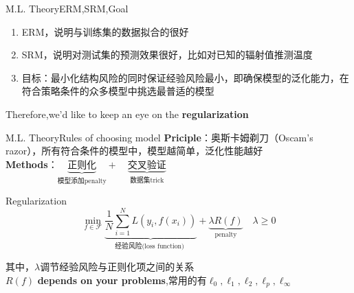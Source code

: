 \documentclass{beamer}
\begin{document}

\begin{frame}{M.L. Theory}{\quad \quad\quad ERM,SRM,Goal}
\begin{enumerate}
  \item ERM，说明与训练集的数据拟合的很好
  \item SRM，说明对测试集的预测效果很好，比如对已知的辐射值推测温度
  \item 目标：最小化结构风险的同时保证经验风险最小，即确保模型的泛化能力，在符合策略条件的众多模型中挑选最普适的模型
  \end{enumerate}  
  \quad \quad Therefore,we\rq{}d like to keep an eye on the \textbf{regularization}


\end{frame}
\begin{frame}[t]{M.L. Theory}{\quad \quad\quad Rules of choosing model}
\textbf{Priciple}：奥斯卡姆剃刀（Oscam's razor），所有符合条件的模型中，模型越简单，泛化性能越好\\
\textbf{Methods}：$
 \underbrace{\textbf{正则化}}_{\text{模型添加penalty}} +\quad  \underbrace{\textbf{交叉验证}}_{\text{数据集trick}}$


\begin{block}{Regularization}
\begin{equation}
\min\limits_{f \in \mathcal{F}}\underbrace{\frac{1}{N}\sum_{i=1}^N L(y_i,f(x_i))}_{\text{经验风险(loss function) }}+ \underbrace{ \lambda R(f)}_{\text{penalty}}\quad \lambda \geq 0
\end{equation}

其中，$\lambda$调节经验风险与正则化项之间的关系\\
$R(f)$ \textbf{depends on your problems},常用的有$\ell_0,\ell_1,\ell_2,\ell_p,\ell_\infty $

\end{block}
\end{frame}
\end{document}
